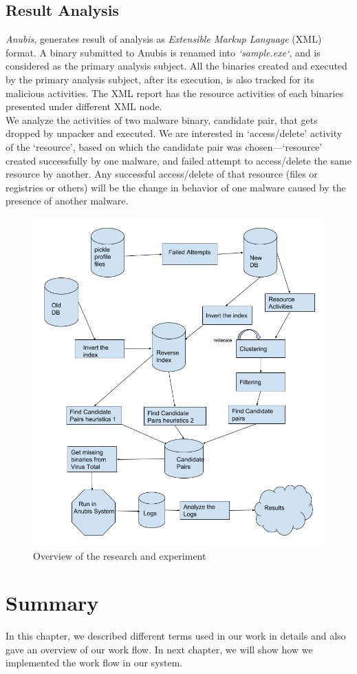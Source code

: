 \subsection{Result Analysis}
\label{sub:Result Analysis}
\emph{Anubis}, generates result of analysis as \emph{Extensible Markup Language} (XML) format.
A binary submitted to Anubis is renamed into \emph{`sample.exe`}, and is considered as the primary analysis subject.
All the binaries created and executed by the primary analysis subject, after its execution, is also tracked for its malicious activities.
The XML report has the resource activities of each binaries presented under different XML node.\\
We analyze the activities of two malware binary, candidate pair, that gets dropped by unpacker and executed.
We are interested in `access/delete' activity of the `resource', based on which the candidate pair was chosen---`resource' created successfully by one malware, and failed attempt to access/delete the same resource by another.
Any successful access/delete of that resource (files or registries or others) will be the change in behavior of one malware caused by the presence of another malware.

\begin{figure}[htbp]
  \centering
  \includegraphics[scale=0.47]{figures/bigpicture.png}
  \caption[Big Picture]{Overview of the research and experiment}\label{fig:bigpicture}
\end{figure}

\section{Summary}
\label{sec:Summary}
In this chapter, we described different terms used in our work in details and also gave an overview of our work flow.
In next chapter, we will show how we implemented the work flow in our system.
